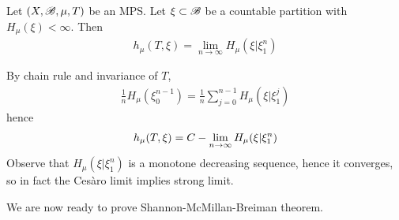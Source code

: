 \documentclass[12pt,a4paper]{report}
\newenvironment{proof}
{\begin{changemargin}{1cm}{0.5cm} 
	}%
	{\end{changemargin}
}
\begin{document}
\lem Let $(X,\mathscr{B}, \mu, T)$ be an MPS. Let $\xi \subset \mathscr{B}$ be a countable partition with $H_{\mu}(\xi)< \infty$. Then
\begin{align*}
h_{\mu}(T,\xi) = \lim_{n\rightarrow \infty} H_{\mu}(\xi | \xi_1^n)
\end{align*}
\begin{proof}
\pf By chain rule and invariance of $T$,
\begin{align*}
\frac{1}{n} H_{\mu}(\xi_0^{n-1}) = \frac{1}{n} \sum_{j=0}^{n-1} H_{\mu}(\xi | \xi_1^j)
\end{align*}
hence
\begin{align*}
h_{\mu}(T,\xi) = C-\lim_{n\rightarrow \infty} H_{\mu}(\xi | \xi_1^n)
\end{align*}
Observe that $H_{\mu}(\xi | \xi_1^n)$ is a monotone decreasing sequence, hence it converges, so in fact the Ces\`{a}ro limit implies strong limit.

\eop
\end{proof}
\s

We are now ready to prove Shannon-McMillan-Breiman theorem.
\s
\end{document}

